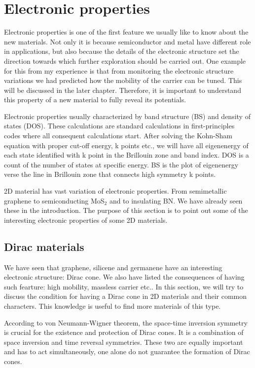 \section{Electronic properties}

Electronic properties is one of the first feature we usually like to know about the new materials. Not only it is because semiconductor and metal have different role in applications, but also because the details of the electronic structure set the direction towards which further exploration should be carried out. One example for this from my experience is that from monitoring the electronic structure variations we had predicted how the mobility of the carrier can be tuned. This will be discussed in the later chapter. Therefore, it is important to understand this property of a new material to fully reveal its potentials.

Electronic properties usually characterized by band structure (BS) and density of states (DOS). These calculations are standard calculations in first-principles codes where all consequent calculations start. After solving the Kohn-Sham equation with proper cut-off energy, k points etc., we will have all eigenenergy of each state identified with k point in the Brillouin zone and band index.  DOS is a count of the number of states at specific energy. BS is the plot of eigenenergy verse the line in Brillouin zone that connects high symmetry k points. 

2D material has vast variation of electronic properties. From semimetallic graphene to semiconducting MoS$_2$ and to insulating BN. We have already seen these in the introduction. The purpose of this section is to point out some of the interesting electronic properties of some 2D materials.

\subsection{Dirac materials}

We have seen that graphene, silicene and germanene have an interesting electronic structure: Dirac cone. We also have listed the consequences of having such fearture: high mobility, massless carrier etc.. In this section, we will try to discuss the condition for having a Dirac cone in 2D materials and their common characters. This knowledge is useful to find more materials of this type. 

According to von Neumann-Wigner theorem, the space-time inversion symmetry is crucial for the existence and protection of Dirac cones\cite{Wang2015b}. It is a combination of space inversion and time reversal symmetries. These two are equally important and has to act simultaneously, one alone do not guarantee the formation of Dirac cones. 

